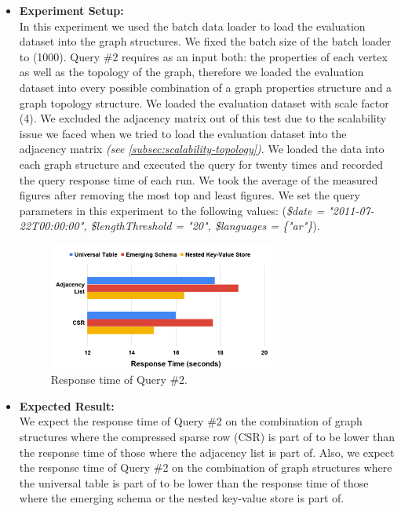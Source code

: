 {\begin{itemize}
\item \textbf{Experiment Setup:}\\
In this experiment we used the batch data loader to load the evaluation dataset into the graph structures. We fixed the batch size of the batch loader to (1000). Query \#2 requires as an input both: the properties of each vertex as well as the topology of the graph, therefore we loaded the evaluation dataset into every possible combination of a graph properties structure and a graph topology structure. We loaded the evaluation dataset with scale factor (4). We excluded the adjacency matrix out of this test due to the scalability issue we faced when we tried to load the evaluation dataset into the adjacency matrix \textit{(see \ref{subsec:scalability-topology})}. We loaded the data into each graph structure and executed the query for twenty times and recorded the query response time of each run. We took the average of the measured figures after removing the most top and least figures. We set the query parameters in this experiment to the following values: (\textit{\$date = "2011-07-22T00:00:00", \$lengthThreshold = "20", \$languages = \{"ar"\}}).



\begin{figure}[H]
\centering
\includegraphics[width=0.7\textwidth]{pics/Query2-Eval.png}
\caption{Response time of Query \#2.}
\label{fig:eval-query2}
\end{figure} 

\item \textbf{Expected Result:}\\
We expect the response time of Query \#2 on the combination of graph structures where the compressed sparse row (CSR) is part of to be lower than the response time of those where the adjacency list is part of. Also, we expect the response time of Query \#2 on the combination of graph structures where the universal table is part of to be lower than the response time of those where the emerging schema or the nested key-value store is part of.


\end{itemize}}
